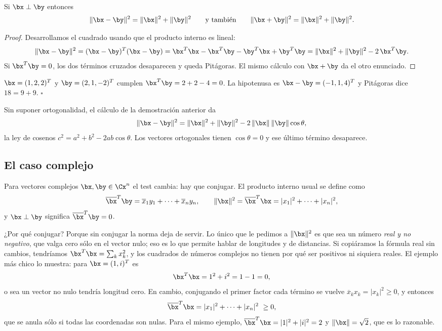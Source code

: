 \begin{teorema}[Pitágoras]\label{teo:pitagoras}
Si $\bx\perp\by$ entonces
\[
\|\bx-\by\|^2=\|\bx\|^2+\|\by\|^2
\qquad\text{y también}\qquad
\|\bx+\by\|^2=\|\bx\|^2+\|\by\|^2 .
\]
\end{teorema}

\begin{proof}
Desarrollamos el cuadrado usando que el producto interno es lineal:
\[
\|\bx-\by\|^2=(\bx-\by)^T(\bx-\by)
=\bx^T\bx-\bx^T\by-\by^T\bx+\by^T\by
=\|\bx\|^2+\|\by\|^2-2\,\bx^T\by .
\]
Si $\bx^T\by=0$, los dos términos cruzados desaparecen y queda
Pitágoras. El mismo cálculo con $\bx+\by$ da el otro enunciado.
\end{proof}

\begin{ejemplo}
$\bx=(1,2,2)^T$ y $\by=(2,1,-2)^T$ cumplen
$\bx^T\by=2+2-4=0$. La hipotenusa es $\bx-\by=(-1,1,4)^T$ y
Pitágoras dice $18=9+9$. \hfill$\square$
\end{ejemplo}

\begin{observacion}
Sin suponer ortogonalidad, el cálculo de la demostración anterior da
\[
\|\bx-\by\|^2=\|\bx\|^2+\|\by\|^2-2\,\|\bx\|\,\|\by\|\cos\theta ,
\]
la ley de cosenos $c^2=a^2+b^2-2ab\cos\theta$. Los vectores ortogonales
tienen $\cos\theta=0$ y ese último término desaparece.
\end{observacion}


\subsection*{El caso complejo}\label{sec:producto-interno-complejo}

Para vectores complejos $\bx,\by\in\Cx^n$ el test cambia: hay que conjugar.
El producto interno usual se define como
\[
\overline{\bx}^T\by=\overline{x}_1y_1+\cdots+\overline{x}_ny_n ,
\qquad
\|\bx\|^2=\overline{\bx}^T\bx=|x_1|^2+\cdots+|x_n|^2 ,
\]
y $\bx\perp\by$ significa $\overline{\bx}^T\by=0$.

¿Por qué conjugar? Porque sin conjugar la norma deja de servir. Lo único que
le pedimos a $\|\bx\|^2$ es que sea un número \emph{real y no negativo}, que
valga cero sólo en el vector nulo; eso es lo que permite hablar de longitudes
y de distancias. Si copiáramos la fórmula real sin cambios, tendríamos
$\bx^T\bx=\sum_k x_k^2$, y los cuadrados de números complejos no tienen por qué
ser positivos ni siquiera reales. El ejemplo más chico lo muestra: para
$\bx=(1,i)^T$ es
\[
\bx^T\bx = 1^2+i^2 = 1-1 = 0 ,
\]
o sea un vector no nulo tendría longitud cero. En cambio, conjugando el
primer factor cada término se vuelve
$\overline{x}_k x_k=|x_k|^2\ge0$, y entonces
\[
\overline{\bx}^T\bx=|x_1|^2+\cdots+|x_n|^2\ \ge 0 ,
\]
que se anula sólo si todas las coordenadas son nulas. Para el mismo ejemplo,
$\overline{\bx}^T\bx=|1|^2+|i|^2=2$ y $\|\bx\|=\sqrt2$, que es lo razonable.

